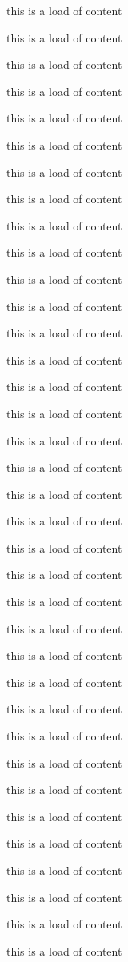   

  this is a load of content
  
  this is a load of content
  
  this is a load of content
  
  this is a load of content
  
  this is a load of content
  
  this is a load of content
  
  
  this is a load of content
  
  this is a load of content
  
  this is a load of content
  
  this is a load of content
  
  this is a load of content
  
  this is a load of content
  
  
  this is a load of content
  
  this is a load of content
  
  this is a load of content
  
  this is a load of content
  
  this is a load of content
  
  this is a load of content
  
  
  this is a load of content
  
  this is a load of content
  
  this is a load of content
  
  this is a load of content
  
  this is a load of content
  
  this is a load of content
  
  
  this is a load of content
  
  this is a load of content
  
  this is a load of content
  
  this is a load of content
  
  this is a load of content
  
  this is a load of content
  
  
  this is a load of content
  
  this is a load of content
  
  this is a load of content
  
  this is a load of content
  
  this is a load of content
  
  this is a load of content
  

